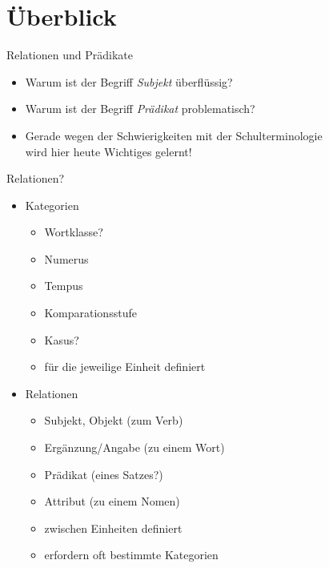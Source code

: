 
\section{Überblick}

\begin{frame}
  {Relationen und Prädikate}
  \pause
  \begin{itemize}[<+->]
    \item Warum ist der Begriff \textit{Subjekt} überflüssig?
    \item Warum ist der Begriff \textit{Prädikat} problematisch?
      \Halbzeile
    \item Gerade \alert{wegen} der Schwierigkeiten mit der Schulterminologie\\
      wird hier heute Wichtiges gelernt!
  \end{itemize}
\end{frame}

\begin{frame}
  {Relationen?}
  \pause
  \begin{itemize}[<+->]
    \item \alert{Kategorien}
      \begin{itemize}[<+->]
        \item Wortklasse?
        \item Numerus
        \item Tempus
        \item Komparationsstufe
        \item Kasus?
          \Halbzeile
        \item \alert{für die jeweilige Einheit definiert}
      \end{itemize}
      \Halbzeile
    \item \alert{Relationen}
      \begin{itemize}[<+->]
        \item Subjekt, Objekt (zum Verb)
        \item Ergänzung\slash Angabe (zu einem Wort)
        \item Prädikat (eines Satzes?)
        \item Attribut (zu einem Nomen)
          \Halbzeile
        \item \alert{zwischen Einheiten definiert}
        \item \alert{erfordern oft bestimmte Kategorien}
      \end{itemize}
  \end{itemize}
  \onslide<+->
  \Halbzeile
\end{frame}

